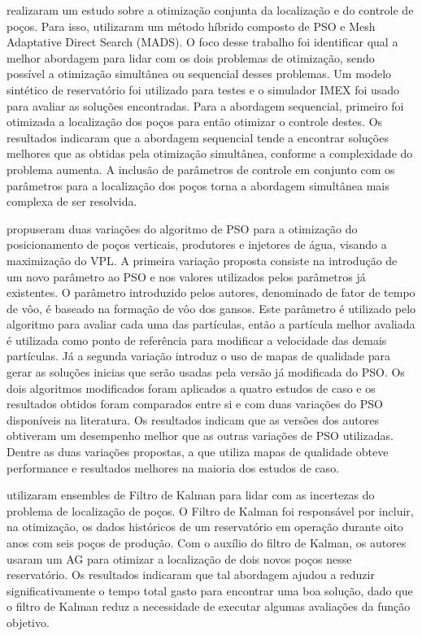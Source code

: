  realizaram um estudo sobre a otimização conjunta da localização e do controle de poços. Para isso, utilizaram um método híbrido composto de PSO e Mesh Adaptative Direct Search (MADS). O foco desse trabalho foi identificar qual a melhor abordagem para lidar com os dois problemas de otimização, sendo possível a otimização simultânea ou sequencial desses problemas. Um modelo sintético de reservatório foi utilizado para testes e o simulador IMEX foi usado para avaliar as soluções encontradas. Para a abordagem sequencial, primeiro foi otimizada a localização dos poços para então otimizar o controle destes. Os resultados indicaram que a abordagem sequencial tende a encontrar soluções melhores que as obtidas pela otimização simultânea, conforme a complexidade do problema aumenta. A inclusão de parâmetros de controle em conjunto com os parâmetros para a localização dos poços torna a abordagem simultânea mais complexa de ser resolvida.

 propuseram duas variações do algoritmo de PSO para a otimização do posicionamento de poços verticais, produtores e injetores de água, visando a maximização do VPL. A primeira variação proposta consiste na introdução de um novo parâmetro ao PSO e nos valores utilizados pelos parâmetros já existentes. O parâmetro introduzido pelos autores, denominado de fator de tempo de vôo, é baseado na formação de vôo dos gansos. Este parâmetro é utilizado pelo algoritmo para avaliar cada uma das partículas, então a partícula melhor avaliada é utilizada como ponto de referência para modificar a velocidade das demais partículas. Já a segunda variação introduz o uso de mapas de qualidade para gerar as soluções inicias que serão usadas pela versão já modificada do PSO. Os dois algoritmos modificados foram aplicados a quatro estudos de caso e os resultados obtidos foram comparados entre si e com duas variações do PSO disponíveis na literatura. Os resultados indicam que as versões dos autores obtiveram um desempenho melhor que as outras variações de PSO utilizadas. Dentre as duas variações propostas, a que utiliza mapas de qualidade obteve performance e resultados melhores na maioria dos estudos de caso.

 utilizaram ensembles de Filtro de Kalman para lidar com as incertezas do problema de localização de poços. O Filtro de Kalman foi responsável por incluir, na otimização, os dados históricos de um reservatório em operação durante oito anos com seis poços de produção. Com o auxílio do filtro de Kalman, os autores usaram um AG para otimizar a localização de dois novos poços nesse reservatório. Os resultados indicaram que tal abordagem ajudou a reduzir significativamente o tempo total gasto para encontrar uma boa solução, dado que o filtro de Kalman reduz a necessidade de executar algumas avaliações da função objetivo.

